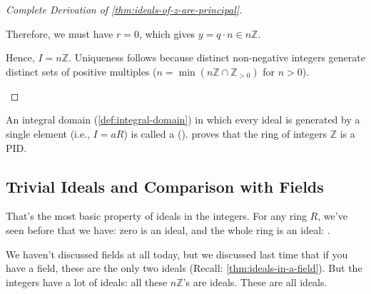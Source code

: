 \begin{proofWrapper}
\begin{content}
\begin{proof}[Complete Derivation of \cref{thm:ideals-of-z-are-principal}]
\begin{description}
\begin{itemize}
        Therefore, we must have $r = 0$, which gives $y = q \cdot n \in n\mathbb{Z}$.
    \end{itemize}
    Hence, $I = n\mathbb{Z}$. Uniqueness follows because distinct non-negative integers generate distinct sets of positive multiples ($n = \min(n\mathbb{Z} \cap \mathbb{Z}_{>0})$ for $n > 0$).
\end{description}
\end{proof}
\end{content}

\end{proofWrapper}

\begin{insight}
An integral domain (\cref{def:integral-domain}) in which every ideal is generated by a single element (i.e., $I = aR$) is called a  ().  proves that the ring of integers $\mathbb{Z}$ is a PID.
\end{insight}

\subsection{Trivial Ideals and Comparison with Fields}

\begin{speech}[00:56:31 - 00:57:05]
That's the most basic property of ideals in the integers. For any ring $R$, we've seen before that we have: zero is an ideal, and the whole ring is an ideal: .

We haven't discussed fields at all today, but we discussed last time that if you have a field, these are the only two ideals (Recall: \cref{thm:ideals-in-a-field}). But the integers have a lot of ideals: all these $n\mathbb{Z}$'s are ideals. These are all ideals.
\end{speech}

